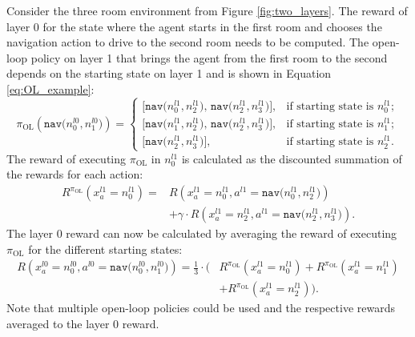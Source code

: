 \begin{example}\label{ex:R_OL}
Consider the three room environment from Figure \ref{fig:two_layers}. The reward of layer 0 for the state where the agent starts in the first room and chooses the navigation action to drive to the second room needs to be computed. The open-loop policy on layer 1 that brings the agent from the first room to the second depends on the starting state on layer 1 and is shown in Equation \ref{eq:OL_example}:
\begin{equation}\label{eq:OL_example}
    \pi_\text{OL}(\texttt{nav($n_0^{l0}, n_1^{l0}$)}) = \begin{cases}
    \texttt{[nav($n_0^{l1}, n_2^{l1}$), nav($n_2^{l1}, n_3^{l1}$)]}, & \text{if starting state is }n_0^{l1};\\
    \texttt{[nav($n_1^{l1}, n_2^{l1}$), nav($n_2^{l1}, n_3^{l1}$)]}, & \text{if starting state is }n_1^{l1};\\
    \texttt{[nav($n_2^{l1}, n_3^{l1}$)]}, & \text{if starting state is }n_2^{l1}.
    \end{cases}
\end{equation}
The reward of executing $\pi_\text{OL}$ in $n_0^{l1}$ is calculated as the discounted summation of the rewards for each action:
\begin{equation}
    \begin{aligned}
    R^{\pi_\text{OL}}\left(x_a^{l1}=n_0^{l1}\right)=
    &R\left(x_a^{l1}=n_0^{l1}, a^{l1}=\texttt{nav($n_0^{l1}, n_2^{l1}$)} \right) \\
    &+ \gamma \cdot R\left(x_a^{l1}=n_2^{l1}, a^{l1}=\texttt{nav($n_2^{l1}, n_3^{l1}$)} \right).
\end{aligned}
\end{equation}
The layer 0 reward can now be calculated by averaging the reward of executing $\pi_\text{OL}$ for the different starting states:
\begin{equation}
    \begin{aligned}
       R\left(x_a^{l0}=n_0^{l0}, a^{l0}=\texttt{nav($n_0^{l0}, n_1^{l0}$)}\right) = \frac{1}{3}\cdot \big(&R^{\pi_\text{OL}}\left(x_a^{l1}=n_0^{l1}\right) + R^{\pi_\text{OL}}\left(x_a^{l1}=n_1^{l1}\right)\\
       &+ R^{\pi_\text{OL}}\left(x_a^{l1}=n_2^{l1}\right)\big).
    \end{aligned}
\end{equation}
Note that multiple open-loop policies could be used and the respective rewards averaged to the layer 0 reward. 
\demo
\end{example}

